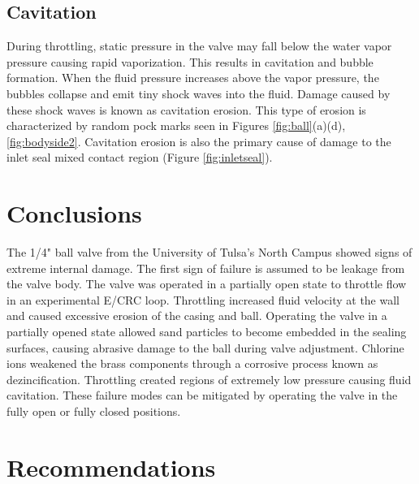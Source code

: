 \documentclass[]{article}
\begin{document}
\subsection{Cavitation}
During throttling, static pressure in the valve may fall below the water vapor pressure causing rapid vaporization. This results in cavitation and bubble formation. When the fluid pressure increases above the vapor pressure, the bubbles collapse and emit tiny shock waves into the fluid. Damage caused by these shock waves is known as cavitation erosion. This type of erosion is characterized by random pock marks seen in Figures \ref{fig:ball}(a)(d), \ref{fig:bodyside2}. Cavitation erosion is also the primary cause of damage to the inlet seal mixed contact region (Figure \ref{fig:inletseal}).

\section{Conclusions}
The 1/4" ball valve from the University of Tulsa's North Campus showed signs of extreme internal damage. The first sign of failure is assumed to be leakage from the valve body. The valve was operated in a partially open state to throttle flow in an experimental E/CRC loop. Throttling increased fluid velocity at the wall and caused excessive erosion of the casing and ball. Operating the valve in a partially opened state allowed sand particles to become embedded in the sealing surfaces, causing abrasive damage to the ball during valve adjustment. Chlorine ions weakened the brass components through a corrosive process known as dezincification. Throttling created regions of extremely low pressure causing fluid cavitation. These failure modes can be mitigated by operating the valve in the fully open or fully closed positions. 

\section{Recommendations}
\end{document}

